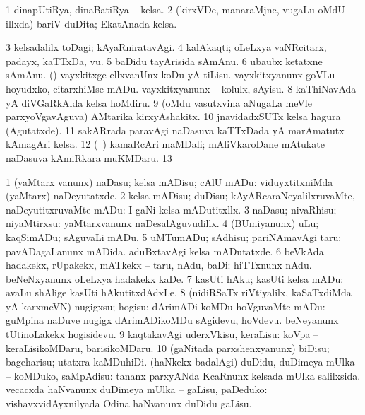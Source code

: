 {{{{{{\begin{center}
\noindent
\gl{\pagu}
\expl{}
\bmng
\bnum
\num{1}  dinapUtiRya, dinaBatiRya -- kelsa. 
\num{2}  (kirxVDe, manaraMjne, \mo vugaLu oMdU illxda) bariV duDita; EkatAnada kelsa. 
\num{3}  kelsadalilx toDagi; kAyaRniratavAgi. 
\num{4}  kalAkaqti; oLeLxya vaNRcitarx, padayx, kaTTxDa, \mo vu. 
\num{5}  baDidu tayArisida sAmAnu. 
\num{6}  ubaubx ketatxne sAmAnu. 
  (\AmA) 
\banum
{} vayxkitxge ellxvanUnx koDu yA tiLisu. 
 vayxkitxyanunx goVLu hoyudxko, citarxhiMse mADu. 
 vayxkitxyanunx -- kolulx, sAyisu. 
\eanum
\numie
\num{8}  kaThiNavAda yA diVGaRkAlda kelsa hoMdiru. 
\num{9}  (oMdu vasutxvina aNugaLa meVle parxyoVgavAguva) AMtarika kirxyAshakitx. 
\num{10}  jnavidadxSUTx kelsa hagura (Agutatxde). 
\num{11}  sakARrada paravAgi naDasuva kaTTxDada yA marAmatutx kAmagAri kelsa. 
\num{12}  (\kanmu\ \birx) kamaRcAri maMDali; mAliVkaroDane mAtukate naDasuva kAmiRkara muKMDaru. 
\num{13}  
\enum
\emng
\eentry

\bentry
{} 
\gl{\kirx}


\noindent
\gl{\sakirx}
\bmng
\bnum
\num{1} (yaMtarx \mo vanunx) naDasu; kelsa mADisu; cAlU mADu:  viduyxtitxniMda (yaMtarx) naDeyutatxde. 
\num{2} kelsa mADisu; duDisu; kAyARcaraNeyalilxruvaMte, naDeyutitxruvaMte mADu:  I gaNi kelsa mADutitxllx. 
\num{3} naDasu; nivaRhisu; niyaMtirxsu:  yaMtarxvanunx naDesalAguvudillx. 
\num{4} (BUmiyanunx) uLu; kaqSimADu; sAguvaLi mADu. 
\num{5} uMTumADu; sAdhisu; pariNAmavAgi taru:  pavADagaLanunx mADida.  aduBxtavAgi kelsa mADutatxde. 
\num{6} beVkAda hadakekx, rUpakekx, mATkekx -- taru, nAdu, baDi:  hiTTxnunx nAdu.  beNeNxyanunx oLeLxya hadakekx kaDe. 
\num{7} kasUti hAku; kasUti kelsa mADu:  avaLu shAlige kasUti hAkutitxdAdxLe. 
\num{8} (nidiRSaTx riVtiyalilx, kaSaTxdiMda yA karxmeVN) nugigxsu; hogisu; dArimADi koMDu hoVguvaMte mADu:  guMpina naDuve nugigx dArimADikoMDu sAgidevu, hoVdevu.  beNeyanunx tUtinoLakekx hogisidevu. 
\num{9} kaqtakavAgi uderxVkisu, keraLisu:  koVpa -- keraLisikoMDaru, barisikoMDaru. 
\num{10} (gaNitada parxshenxyanunx) biDisu; bageharisu; utatxra kaMDuhiDi. 
\banum
{} (haNkekx badalAgi) duDidu, duDimeya mUlka -- koMDuko, saMpAdisu:   tananx parxyANda KcaRnunx kelsada mUlka salilxsida. 
 vecacxda haNvanunx duDimeya mUlka -- gaLisu, paDeduko:  vishavxvidAyxnilyada Odina haNvanunx duDidu gaLisu. 
\eanum
\numie
\enum
\emng


\end{center}}}}}}}
